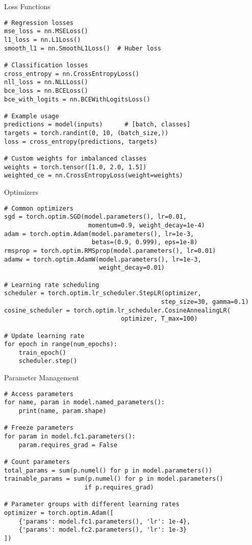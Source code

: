 \documentclass[aspectratio=169,10pt]{beamer}
\begin{document}
\begin{frame}[fragile]{Loss Functions}
\begin{lstlisting}
# Regression losses
mse_loss = nn.MSELoss()
l1_loss = nn.L1Loss()
smooth_l1 = nn.SmoothL1Loss()  # Huber loss

# Classification losses
cross_entropy = nn.CrossEntropyLoss()
nll_loss = nn.NLLLoss()
bce_loss = nn.BCELoss()
bce_with_logits = nn.BCEWithLogitsLoss()

# Example usage
predictions = model(inputs)      # [batch, classes]
targets = torch.randint(0, 10, (batch_size,))
loss = cross_entropy(predictions, targets)

# Custom weights for imbalanced classes
weights = torch.tensor([1.0, 2.0, 1.5])
weighted_ce = nn.CrossEntropyLoss(weight=weights)
\end{lstlisting}
\end{frame}

\begin{frame}[fragile]{Optimizers}
\begin{lstlisting}
# Common optimizers
sgd = torch.optim.SGD(model.parameters(), lr=0.01, 
                       momentum=0.9, weight_decay=1e-4)
adam = torch.optim.Adam(model.parameters(), lr=1e-3,
                        betas=(0.9, 0.999), eps=1e-8)
rmsprop = torch.optim.RMSprop(model.parameters(), lr=0.01)
adamw = torch.optim.AdamW(model.parameters(), lr=1e-3,
                          weight_decay=0.01)

# Learning rate scheduling
scheduler = torch.optim.lr_scheduler.StepLR(optimizer, 
                                           step_size=30, gamma=0.1)
cosine_scheduler = torch.optim.lr_scheduler.CosineAnnealingLR(
                                optimizer, T_max=100)

# Update learning rate
for epoch in range(num_epochs):
    train_epoch()
    scheduler.step()
\end{lstlisting}
\end{frame}

\begin{frame}[fragile]{Parameter Management}
\begin{lstlisting}
# Access parameters
for name, param in model.named_parameters():
    print(name, param.shape)

# Freeze parameters
for param in model.fc1.parameters():
    param.requires_grad = False

# Count parameters
total_params = sum(p.numel() for p in model.parameters())
trainable_params = sum(p.numel() for p in model.parameters() 
                      if p.requires_grad)

# Parameter groups with different learning rates
optimizer = torch.optim.Adam([
    {'params': model.fc1.parameters(), 'lr': 1e-4},
    {'params': model.fc2.parameters(), 'lr': 1e-3}
])
\end{lstlisting}
\end{frame}
\end{document}
